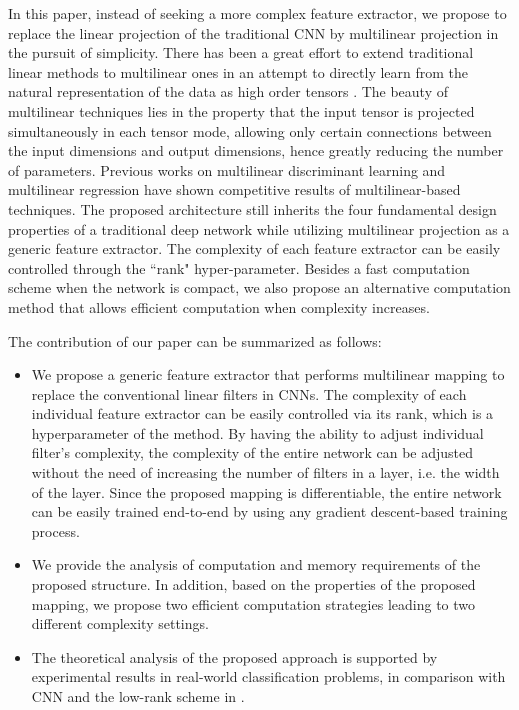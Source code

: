 \documentclass[conference,usletter]{IEEEtran}
\begin{document}
In this paper, instead of seeking a more complex feature extractor, we propose to replace the linear projection of the traditional CNN by multilinear projection in the pursuit of simplicity. There has been a great effort to extend traditional linear methods to multilinear ones in an attempt to directly learn from the natural representation of the data as high order tensors \cite{li2014multilinear,yan2005discriminant,zhou2013tensor,thanh2017tensor,tao2007general,lu2008mpca}. The beauty of multilinear techniques lies in the property that the input tensor is projected simultaneously in each tensor mode, allowing only certain connections between the input dimensions and output dimensions, hence greatly reducing the number of parameters. Previous works on multilinear discriminant learning and multilinear regression \cite{guo2012tensor,li2014multilinear,yan2005discriminant,zhou2013tensor,thanh2017tensor,tao2007general} have shown competitive results of multilinear-based techniques. The proposed architecture still inherits the four fundamental design properties of a traditional deep network while utilizing multilinear projection as a generic feature extractor. The complexity of each feature extractor can be easily controlled through the ``rank" hyper-parameter. Besides a fast computation scheme when the network is compact, we also propose an alternative computation method that allows efficient computation when complexity increases.

The contribution of our paper can be summarized as follows:
\begin{itemize}
	\item We propose a generic feature extractor that performs multilinear mapping to replace the conventional linear filters in CNNs. The complexity of each individual feature extractor can be easily controlled via its rank, which is a hyperparameter of the method. By having the ability to adjust individual filter's complexity, the complexity of the entire network can be adjusted without the need of increasing the number of filters in a layer, i.e. the width of the layer. Since the proposed mapping is differentiable, the entire network can be easily trained end-to-end by using any gradient descent-based training process.
	\item We provide the analysis of computation and memory requirements of the proposed structure. In addition, based on the properties of the proposed mapping, we propose two efficient computation strategies leading to two different complexity settings.
	\item The theoretical analysis of the proposed approach is supported by experimental results in real-world classification problems, in comparison with CNN and the low-rank scheme in \cite{tai2015convolutional}.
\end{itemize}
\end{document}
